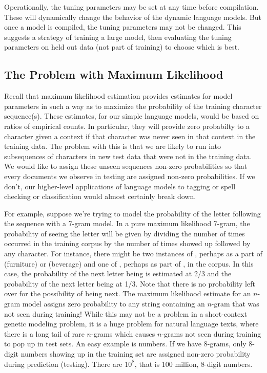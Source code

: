 Operationally, the tuning parameters may be set at any time before
compilation.  These will dynamically change the behavior of the
dynamic language models.  But once a model is compiled, the tuning
parameters may not be changed.  This suggests a strategy of training
a large model, then evaluating the tuning parameters on held out data
(not part of training) to choose which is best.  

\subsection{The Problem with Maximum Likelihood}

Recall that maximum likelihood estimation provides estimates for model
parameters in such a way as to maximize the probability of the
training character sequence(s).  These estimates, for our simple
language models, would be based on ratios of empirical counts.  In
particular, they will provide zero probabilty to a character given a
context if that character was never seen in that context in the
training data.  The problem with this is that we are likely to run
into subsequences of characters in new test data that were not in the
training data.  We would like to assign these unseen sequences
non-zero probabilities so that every documents we observe in testing are
assigned non-zero probabilities.  If we don't, our higher-level
applications of language models to tagging or spell checking or
classification would almost certainly break down.

For example, suppose we're trying to model the probability of the
letter  following the sequence  with a 7-gram model.  In a pure maximum likelihood 7-gram, the
probability of seeing the letter  will be given by
dividing the number of times  occurred in the
training corpus by the number of times  showed
up followed by any character.  For instance, there might be two
instances of , perhaps as a part of
 (furniture) or 
(beverage) and one of , perhaps as part of
, in the corpus.  In this case, the
probability of the next letter being  is estimated at
2/3 and the probability of the next letter being  at
1/3.  Note that there is no probability left over for the possibility
of  being next.  The maximum likelihood estimate for an
$n$-gram model assigns zero probability to any string containing an
$n$-gram that was not seen during training!  While this may not be a
problem in a short-context genetic modeling problem, it is a huge
problem for natural language texts, where there is a long tail of rare
$n$-grams which causes $n$-grams not seen during training to pop up in
test sets.  An easy example is numbers.  If we have 8-grams, only
8-digit numbers showing up in the training set are assigned non-zero
probability during prediction (testing).  There are $10^8$, that is
100 million, 8-digit numbers.  

